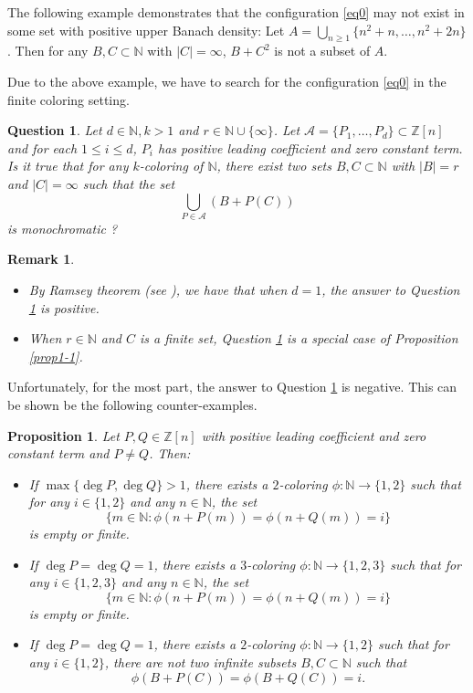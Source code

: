 \documentclass[reqno,12pt]{amsart}
\newtheorem{prop}[thm]{Proposition}
\newtheorem{ques}[thm]{Question}
\newtheorem{rem}[thm]{Remark}
\def \N {\mathbb N}
\def \Z {\mathbb Z}
\numberwithin{equation}{section}
\begin{document}
The following example demonstrates that the configuration \eqref{eq0} may not exist in some set with positive upper Banach density: Let $A=\bigcup_{n\ge 1}\{n^2+n,\ldots,n^2+2n\}$. Then for any $B,C\subset \N$ with $|C|=\infty$, $B+C^2$ is not a subset of $A$.

Due to the above example, we have to search for the configuration \eqref{eq0} in the finite coloring setting.
\begin{ques}\label{Q1}
	Let $d\in \N,k>1$ and $r\in \N\cup \{\infty\}$. Let $\mathcal{A}=\{P_1,\ldots,P_d\}\subset \Z[n]$ and for each $1\le i\le d$, $P_i$ has positive leading coefficient and zero constant term. Is it true that for any $k$-coloring of  $\N$, there exist two sets $B,C\subset \N$ with $|B|=r$ and $|C|=\infty$ such that the set $$\bigcup_{P\in \mathcal{A}} (B+P(C))$$ is monochromatic ?
\end{ques}
\begin{rem}
	\begin{itemize}
		\item[(1)] By Ramsey theorem (see \cite[Theorem 5 of Chapter 1]{GRS}), we have that when $d=1$, the answer to Question \ref{Q1} is positive.
		\item[(2)] When $r\in \N$ and $C$ is a finite set, Question \ref{Q1} is a special case of Proposition \ref{prop1-1}.
	\end{itemize}
\end{rem}
Unfortunately, for the most part, the answer to Question \ref{Q1} is negative. This can be shown be the following counter-examples.
\begin{prop}\label{P1}
	Let $P,Q\in \Z[n]$ with positive leading coefficient and zero constant term and $P\neq Q$. Then:
	\begin{itemize}
		\item[(1)] If $\max\{\deg P,\deg Q\}>1$, there exists a $2$-coloring $\phi:\N\rightarrow \{1,2\}$ such that for any $i\in \{1,2\}$ and any $n\in \N$, the set $$\{m\in \N:\phi(n+P(m))=\phi(n+Q(m))=i\}$$ is empty or finite.
		\item[(2)] If $\deg P=\deg Q=1$, there exists a $3$-coloring $\phi:\N\rightarrow \{1,2,3\}$ such that for any $i\in \{1,2,3\}$ and any $n\in \N$, the set $$\{m\in \N:\phi(n+P(m))=\phi(n+Q(m))=i\}$$ is empty or finite.
		\item[(3)] If $\deg P=\deg Q=1$, there exists a $2$-coloring $\phi:\N\rightarrow \{1,2\}$ such that for any $i\in \{1,2\}$, there are not two infinite subsets $B,C\subset \N$ such that $$\phi(B+P(C))=\phi(B+Q(C))=i.$$
	\end{itemize}
\end{prop}
\end{document}
